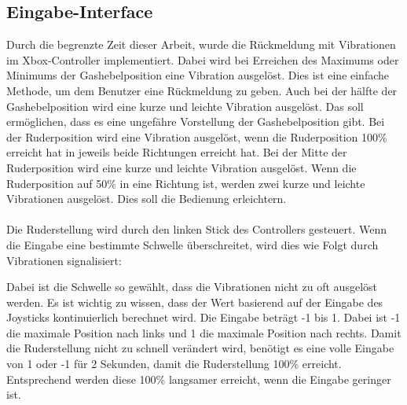 \subsection{Eingabe-Interface}
Durch die begrenzte Zeit dieser Arbeit, wurde die Rückmeldung mit Vibrationen im Xbox-Controller implementiert.
Dabei wird bei Erreichen des Maximums oder Minimums der Gashebelposition eine Vibration ausgelöst. Dies ist eine einfache
Methode, um dem Benutzer eine Rückmeldung zu geben. Auch bei der hälfte der Gashebelposition wird eine kurze und leichte 
Vibration ausgelöst. Das soll ermöglichen, dass es eine ungefähre Vorstellung der Gashebelposition gibt.
Bei der Ruderposition wird eine Vibration ausgelöst, wenn die Ruderposition 100\% erreicht hat in jeweils beide Richtungen
erreicht hat. Bei der Mitte der Ruderposition wird eine kurze und leichte Vibration ausgelöst. Wenn die 
Ruderposition auf 50\% in eine Richtung ist, werden zwei kurze und leichte Vibrationen ausgelöst. Dies soll die Bedienung
erleichtern. \\
\\
Die Ruderstellung wird durch den linken Stick des Controllers gesteuert. Wenn die Eingabe eine bestimmte Schwelle überschreitet,
wird dies wie Folgt durch Vibrationen signalisiert:
\begin{figure}[h!]
    \centering
\end{figure}
Dabei ist die Schwelle so gewählt, dass die Vibrationen nicht zu oft ausgelöst werden. 
Es ist wichtig zu wissen, dass der Wert basierend auf der Eingabe des Joysticks kontinuierlich berechnet wird.
Die Eingabe beträgt -1 bis 1. Dabei ist -1 die maximale Position nach links und 1 die maximale Position nach rechts.
Damit die Ruderstellung nicht zu schnell verändert wird, benötigt es eine volle Eingabe von 1 oder -1 für 2 Sekunden,
damit die Ruderstellung 100\% erreicht. Entsprechend werden diese 100\% langsamer erreicht, wenn die Eingabe geringer
ist.

